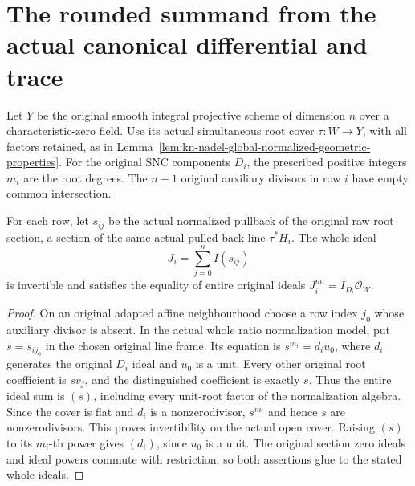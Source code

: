 \section{The rounded summand from the actual canonical differential and trace}
\label{sec:kn-nadel-trace-retraction}

Let $Y$ be the original smooth integral projective scheme of dimension $n$
over a characteristic-zero field.  Use its actual simultaneous root cover
$\tau:W\to Y$, with all factors retained, as in
Lemma~\ref{lem:kn-nadel-global-normalized-geometric-properties}.
For the original SNC components $D_i$, the prescribed positive integers
$m_i$ are the root degrees.  The $n+1$ original auxiliary divisors in row
$i$ have empty common intersection.

\begin{lemma}
\label{lem:kn-nadel-whole-root-ideals}
\notready
For each row, let $s_{ij}$ be the actual normalized pullback of the original
raw root section, a section of the same actual pulled-back line $\tau^*H_i$.
The whole ideal
\[
 J_i=\sum_{j=0}^{n} I(s_{ij})
\]
is invertible and satisfies the equality of entire original ideals
$J_i^{m_i}=I_{D_i}\mathcal O_W$.
\end{lemma}
\begin{proof}
On an original adapted affine neighbourhood choose a row index $j_0$
whose auxiliary divisor is absent.  In the actual whole ratio normalization
model, put $s=s_{ij_0}$ in the chosen original line frame.  Its equation is
$s^{m_i}=d_i u_0$, where $d_i$ generates the original $D_i$ ideal and
$u_0$ is a unit.  Every other original root coefficient is $s v_j$, and
the distinguished coefficient is exactly $s$.  Thus the entire ideal sum
is $(s)$, including every unit-root factor of the normalization algebra.
Since the cover is flat and $d_i$ is a nonzerodivisor, $s^{m_i}$ and hence
$s$ are nonzerodivisors.  This proves invertibility on the actual open
cover.  Raising $(s)$ to its $m_i$-th power gives $(d_i)$, since $u_0$ is
a unit.  The original section zero ideals and ideal powers commute with
restriction, so both assertions glue to the stated whole ideals.
\end{proof}

